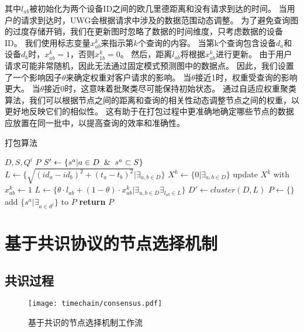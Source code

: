 其中$l_{ab}$被初始化为两个设备ID之间的欧几里德距离和没有请求到达的时间。
当用户的请求到达时，UWG会根据请求中涉及的数据范围动态调整。
为了避免查询图的过度存储开销，我们在更新图时忽略了数据的时间维度，只考虑数据的设备ID。
我们使用标志变量$x_{ab}^k$来指示第$k$个查询的内容。
当第k个查询包含设备$d_a$和设备$d_b$时，$x_{ab}^k=1$，否则$x_{1b}^k=0$。
然后，距离$l_{ab}$将根据$x_{ab}^k$进行更新。
由于用户请求可能非常随机，因此无法通过固定模式预测图中的数据点。
因此，我们设置了一个影响因子$\theta$来确定权重对客户请求的影响。
当$\theta$接近1时，权重受查询的影响更大。
当$\theta$接近0时，这意味着批聚类尽可能保持初始状态。
通过自适应权重聚类算法，我们可以根据节点之间的距离和查询的相关性动态调整节点之间的权重，以更好地反映它们的相似性。
这有助于在打包过程中更准确地确定哪些节点的数据应放置在同一批中，以提高查询的效率和准确性。

\begin{algorithm}[t]
	\caption{打包算法}
	\label{algo:package}
    \begin{algorithmic}[1]
        \REQUIRE $D, S, Q^{i}$
        \ENSURE $P$
        \STATE $S' \gets \{s^a | a \in D \And s^a \subset S\}$
        \STATE $L \gets \Big\{ \sqrt{ (id_a - id_b)^2 + (t_a - t_b)^2 } \Big| \exists_{a,b \in D} \Big\}$
        \STATE $X^k \gets \{0 | \exists_{a,b \in D} \}$
                \STATE \textnormal{update $X^k$ with $x^k_{ab} \gets 1$}
            \ENDIF
        \ENDFOR
        \STATE $L \gets \Big\{ \theta \cdot l_{ab} + (1 - \theta) \cdot x_{ab}^k \Big| \exists_{a,b \in D} \exists_{l_{ab} \in L} \Big\}$
        \STATE $D' \gets \textit{cluster}(D, L)$
        \STATE $P \gets \{\}$
            \STATE \textnormal{add $\{ s^a | \exists_{a \in d^j} \}$ to $P$}
        \ENDFOR
        \STATE \textbf{return} $P$
    \end{algorithmic}
\end{algorithm}

\chapter{基于共识协议的节点选择机制}
\label{sec:consensus}

\section{共识过程}

\begin{figure}[t]
    \centering
    \texttt{[image: timechain/consensus.pdf]}
    \caption{基于共识的节点选择机制工作流}
    \label{fig:consensus}
\end{figure}

